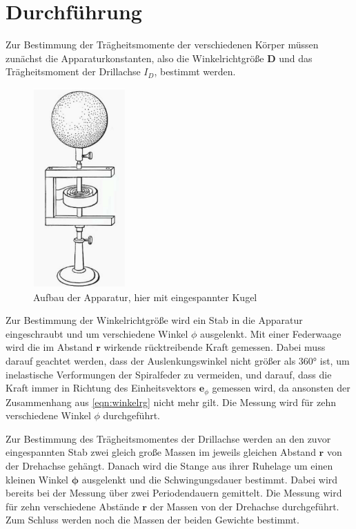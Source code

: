 \section{Durchführung}
\label{sec:Durchführung}

Zur Bestimmung der Trägheitsmomente der verschiedenen Körper müssen zunächst die
Apparaturkonstanten, also die Winkelrichtgröße $\symbf{D}$ und das Trägheitsmoment
der Drillachse $I_D$, bestimmt werden.
\begin{figure}
  \centering
  \includegraphics[width=100pt]{Aufbau.png}
  \caption{Aufbau der Apparatur, hier mit eingespannter Kugel \cite{Versuchsanleitung}}
  \label{fig:Aufbau}
\end{figure}


Zur Bestimmung der Winkelrichtgröße wird ein Stab in die Apparatur eingeschraubt und
um verschiedene Winkel $\phi$ ausgelenkt. Mit einer Federwaage wird die im Abstand
$\symbf{r}$ wirkende rücktreibende Kraft gemessen. Dabei muss darauf geachtet werden,
dass der Auslenkungswinkel nicht größer als 360° ist, um inelastische Verformungen der
Spiralfeder zu vermeiden, und darauf, dass die Kraft immer in Richtung des Einheitsvektors
$\symbf{e}_{\phi}$ gemessen wird, da ansonsten der Zusammenhang aus \eqref{eqn:winkelrg}
nicht mehr gilt. Die Messung wird für zehn verschiedene Winkel $\phi$ durchgeführt.

Zur Bestimmung des Trägheitsmomentes der Drillachse werden an den zuvor eingespannten
Stab zwei gleich große Massen im jeweils gleichen Abstand $\symbf{r}$ von der
Drehachse gehängt. Danach wird die Stange aus ihrer Ruhelage um einen kleinen Winkel
$\symbf{\phi}$ ausgelenkt und die Schwingungsdauer bestimmt. Dabei wird bereits bei
der Messung über zwei Periodendauern gemittelt. Die Messung wird für zehn verschiedene
Abstände $\symbf{r}$ der Massen von der Drehachse durchgeführt. Zum Schluss werden
noch die Massen der beiden Gewichte bestimmt.

